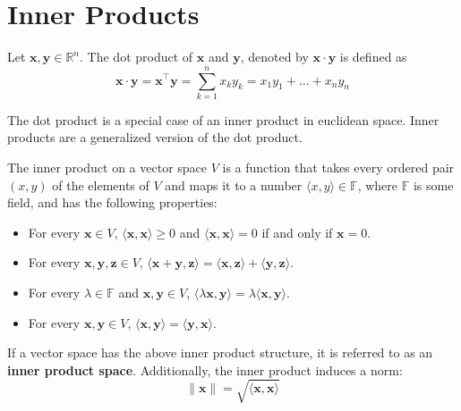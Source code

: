 \documentclass[12pt]{article}
\begin{document}
\section{Inner Products}
\begin{definition}
Let $\mathbf{x}, \mathbf{y}\in\mathbb{R}^n$. The dot product of $\mathbf{x}$ and $\mathbf{y}$, denoted by $\mathbf{x}\cdot \mathbf{y}$ is defined as $$\mathbf{x}\cdot\mathbf{y} = \mathbf{x}^\top\mathbf{y} =\sum_{k=1}^n x_ky_k = x_1y_1 + \ldots + x_ny_n$$
\end{definition}
\noindent The dot product is a special case of an inner product in euclidean space. Inner products are a generalized version of the dot product. 
\begin{definition}
The inner product on a vector space $V$ is a function that takes every ordered pair $(x,y)$ of the elements of $V$ and maps it to a number $\langle x,y\rangle\in \mathbb{F}$, where $\mathbb{F}$ is some field, and has the following properties:
\begin{itemize}
\item For every $\mathbf{x}\in V$, $\langle \mathbf{x}, \mathbf{x}\rangle \geqslant 0$ and  $\langle \mathbf{x}, \mathbf{x}\rangle = 0$ if and only if $\mathbf{x} = 0$.
\item For every $\mathbf{x},\mathbf{y},\mathbf{z}\in V$, $\langle \mathbf{x} + \mathbf{y}, \mathbf{z}\rangle = \langle \mathbf{x}, \mathbf{z}\rangle + \langle \mathbf{y}, \mathbf{z}\rangle$.
\item For every $\lambda\in\mathbb{F}$ and $\mathbf{x},\mathbf{y}\in V$, $\langle\lambda\mathbf{x},\mathbf{y}\rangle = \lambda\langle\mathbf{x},\mathbf{y}\rangle$.
\item For every $\mathbf{x},\mathbf{y}\in V$, $\langle\mathbf{x},\mathbf{y}\rangle = \langle\mathbf{y},\mathbf{x}\rangle$.
\end{itemize}
\end{definition}
\noindent If a vector space has the above inner product structure, it is referred to as an \textbf{inner product space}. Additionally, the inner product induces a norm: $$\|\mathbf{x}\| = \sqrt{\langle \mathbf{x}, \mathbf{x}\rangle}$$
\end{document}
